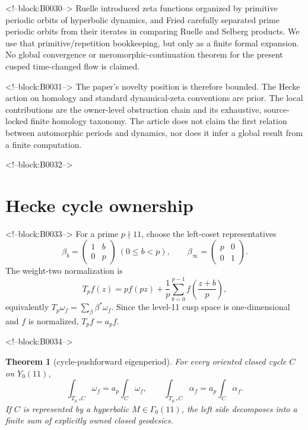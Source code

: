 \documentclass[11pt]{article}
\newtheorem{theorem}{Theorem}[section]
\theoremstyle{definition}
\theoremstyle{remark}
\newcommand{\G}{\Gamma_0(11)}
\begin{document}
<!--block:B0030-->
Ruelle introduced zeta functions organized by primitive periodic orbits of hyperbolic dynamics, and Fried carefully separated prime periodic orbits from their iterates in comparing Ruelle and Selberg products.
\citep[Introduction and flow case]{ruelle1976}
\citep[Section~2]{fried1986}
We use that primitive/repetition bookkeeping, but only as a finite formal expansion. No global convergence or meromorphic-continuation theorem for the present cusped time-changed flow is claimed.

<!--block:B0031-->
The paper's novelty position is therefore bounded. The Hecke action on homology and standard dynamical-zeta conventions are prior. The local contributions are the owner-level obstruction chain and its exhaustive, source-locked finite homology taxonomy. The article does not claim the first relation between automorphic periods and dynamics, nor does it infer a global result from a finite computation.

<!--block:B0032-->
\section{Hecke cycle ownership}

<!--block:B0033-->
For a prime $p\nmid11$, choose the left-coset representatives
\[
\beta_b=\begin{pmatrix}1&b\\0&p\end{pmatrix}\ (0\leq b<p),
\qquad
\beta_\infty=\begin{pmatrix}p&0\\0&1\end{pmatrix}.
\]
The weight-two normalization is
\[
T_pf(z)=pf(pz)+\frac1p\sum_{b=0}^{p-1}f\!\left(\frac{z+b}{p}\right),
\]
equivalently $T_p\omega_f=\sum_\beta\beta^*\omega_f$. Since the level-11 cusp space is one-dimensional and $f$ is normalized, $T_pf=a_pf$.

<!--block:B0034-->
\begin{theorem}[cycle-pushforward eigenperiod]\label{thm:hecke}
For every oriented closed cycle $C$ on $Y_0(11)$,
\[
\int_{T_{p,*}C}\omega_f=a_p\int_C\omega_f,
\qquad
\int_{T_{p,*}C}\alpha_f=a_p\int_C\alpha_f.
\]
If $C$ is represented by a hyperbolic $M\in\G$, the left side decomposes into a finite sum of explicitly owned closed geodesics.
\end{theorem}
\end{document}
